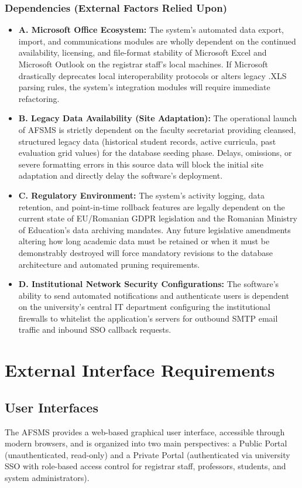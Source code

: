 \documentclass[11pt, a4paper]{article}
\begin{document}
\subsubsection{Dependencies (External Factors Relied Upon)}
\begin{itemize}
    \item \textbf{A. Microsoft Office Ecosystem:} The system's automated data export, import, and communications modules are wholly dependent on the continued availability, licensing, and file-format stability of Microsoft Excel and Microsoft Outlook on the registrar staff's local machines. If Microsoft drastically deprecates local interoperability protocols or alters legacy .XLS parsing rules, the system's integration modules will require immediate refactoring.
    \item \textbf{B. Legacy Data Availability (Site Adaptation):} The operational launch of AFSMS is strictly dependent on the faculty secretariat providing cleansed, structured legacy data (historical student records, active curricula, past evaluation grid values) for the database seeding phase. Delays, omissions, or severe formatting errors in this source data will block the initial site adaptation and directly delay the software's deployment.
    \item \textbf{C. Regulatory Environment:} The system's activity logging, data retention, and point-in-time rollback features are legally dependent on the current state of EU/Romanian GDPR legislation and the Romanian Ministry of Education's data archiving mandates. Any future legislative amendments altering how long academic data must be retained or when it must be demonstrably destroyed will force mandatory revisions to the database architecture and automated pruning requirements.
    \item \textbf{D. Institutional Network Security Configurations:} The software's ability to send automated notifications and authenticate users is dependent on the university's central IT department configuring the institutional firewalls to whitelist the application's servers for outbound SMTP email traffic and inbound SSO callback requests.
\end{itemize}


\section{External Interface Requirements}

\subsection{User Interfaces}
The AFSMS provides a web-based graphical user interface, accessible through modern browsers, and is organized into two main perspectives: a Public Portal (unauthenticated, read-only) and a Private Portal (authenticated via university SSO with role-based access control for registrar staff, professors, students, and system administrators).
\end{document}

